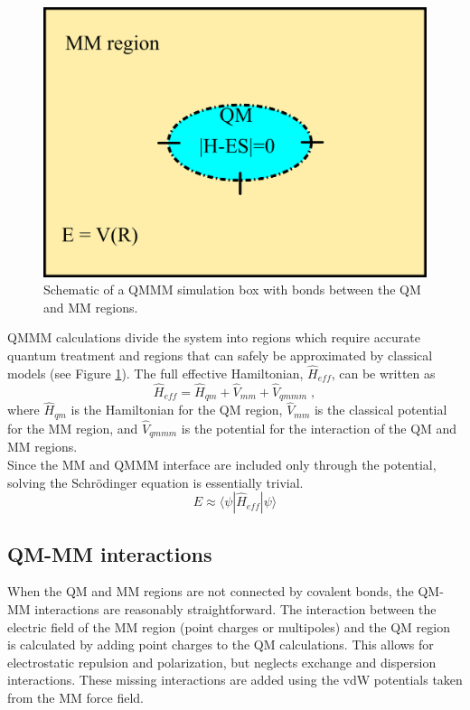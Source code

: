\documentclass[12pt]{report}
\begin{document}
\begin{figure}[hbt]
 \centering
 \includegraphics[scale=0.50]{../doc/images/QMMM_1.png}
 \caption{Schematic of a QMMM simulation box with bonds between the QM and MM
 regions.}
 \label{fig:QMMM1}
\end{figure}

QMMM calculations divide the system into regions which require accurate
quantum treatment and regions that can safely be approximated by classical
models (see Figure \ref{fig:QMMM1}). The full effective Hamiltonian, 
$\hat H_{eff}$, can be written as
\begin{equation}
 \hat H_{eff} = \hat H_{qm} + \hat V_{mm} + \hat V_{qmmm} \; ,
\end{equation}
where $\hat H_{qm}$ is the Hamiltonian for the QM region, $\hat V_{mm}$
is the classical potential for the MM region, and $\hat V_{qmmm}$ is the
potential for the interaction of the QM and MM regions. \\

Since the MM and QMMM interface are included only through the potential,
solving the Schr\"odinger equation is essentially trivial.
\begin{equation}
 E \approx \langle \psi |\hat H_{eff}|\psi \rangle
\end{equation}

\subsection{QM-MM interactions}

When the QM and MM regions are not connected by covalent bonds, the QM-MM
interactions are reasonably straightforward. The interaction between the
electric field of the MM region (point charges or multipoles) and the QM
region is calculated by adding point charges to the QM calculations. This
allows for electrostatic repulsion and polarization, but neglects exchange
and dispersion interactions. These missing interactions are added using the
vdW potentials taken from the MM force field. \\
\end{document}
